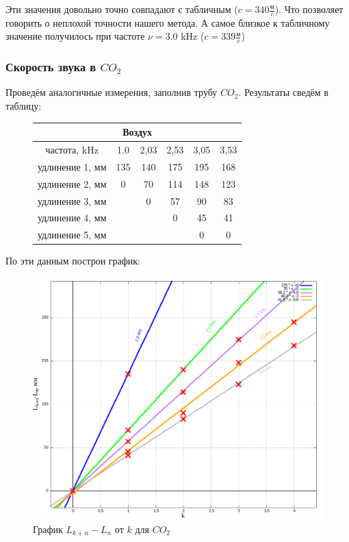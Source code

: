 \documentclass{article}
\begin{document}
Эти значения довольно точно совпадают с табличным ($c = 340\frac{\text{м}}{c}$). Что позволяет
говорить о неплохой точности нашего метода. А самое близкое к табличному значение получилось 
при частоте $\nu = 3.0$ kHz ($c = 339\frac{\text{м}}{c}$)

\subsubsection{Скорость звука в $CO_2$}

Проведём аналогичные измерения, заполнив трубу $CO_2$. Результаты сведём в таблицу:

\begin{figure}[H]
    \centering
    \begin{tabular}{|c|c|c|c|c|c|}
        \hline
        \multicolumn{6}{|c|}{Воздух}                      \\\hline
        частота, kHz   & 1.0 & 2,03 & 2,53 & 3,05 & 3,53  \\\hline
        удлинение 1, мм & 135 & 140  & 175  & 195  & 168  \\\hline
        удлинение 2, мм & 0   & 70   & 114  & 148  & 123  \\\hline
        удлинение 3, мм &     & 0    & 57   & 90   & 83   \\\hline
        удлинение 4, мм &     &      & 0    & 45   & 41   \\\hline
        удлинение 5, мм &     &      &      & 0    & 0    \\\hline
    \end{tabular}
\end{figure}

По эти данным построи график:

\begin{figure}[H]
    \centering
    \includegraphics[width=\textwidth]{co2/co2.png}
    \caption{График $L_{k+n} - L_n$ от $k$ для $CO_2$}
\end{figure}
\end{document}
